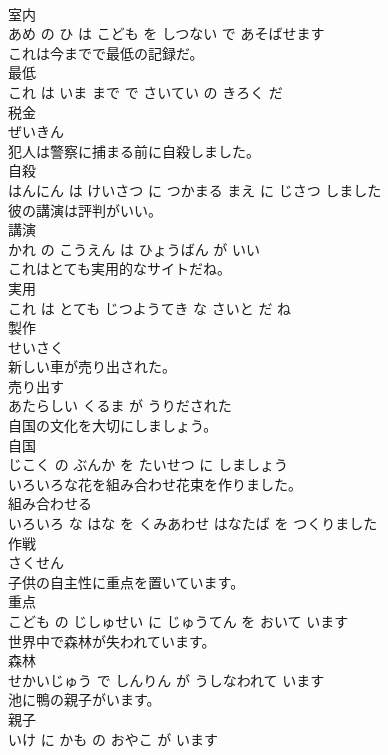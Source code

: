\documentclass[8pt]{extreport}
\begin{document}
\begin{CJK}{UTF8}{min}
\\	室内 
\\	あめ の ひ は こども を しつない で あそばせます		
\\	これは今までで最低の記録だ。	
\\	最低 
\\	これ は いま まで で さいてい の きろく だ		
\\	税金	
\\	ぜいきん		
\\	犯人は警察に捕まる前に自殺しました。	
\\	自殺 
\\	はんにん は けいさつ に つかまる まえ に じさつ しました		
\\	彼の講演は評判がいい。	
\\	講演 
\\	かれ の こうえん は ひょうばん が いい		
\\	これはとても実用的なサイトだね。	
\\	実用 
\\	これ は とても じつようてき な さいと だ ね		
\\	製作	
\\	せいさく		
\\	新しい車が売り出された。	
\\	売り出す 
\\	あたらしい くるま が うりだされた		
\\	自国の文化を大切にしましょう。	
\\	自国 
\\	じこく の ぶんか を たいせつ に しましょう		
\\	いろいろな花を組み合わせ花束を作りました。	
\\	組み合わせる 
\\	いろいろ な はな を くみあわせ はなたば を つくりました		
\\	作戦	
\\	さくせん		
\\	子供の自主性に重点を置いています。	
\\	重点 
\\	こども の じしゅせい に じゅうてん を おいて います		
\\	世界中で森林が失われています。	
\\	森林 
\\	せかいじゅう で しんりん が うしなわれて います		
\\	池に鴨の親子がいます。	
\\	親子 
\\	いけ に かも の おやこ が います		

\end{CJK}
\end{document}
